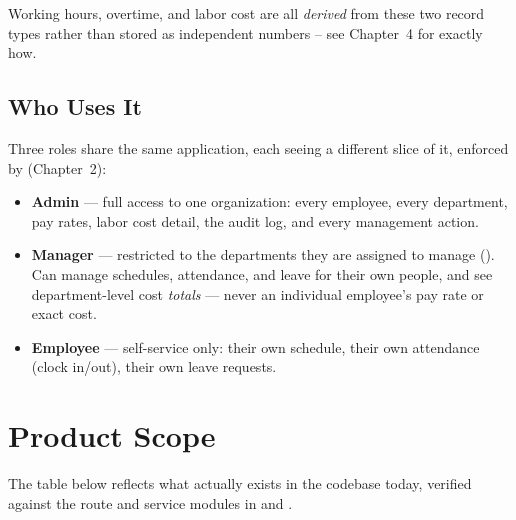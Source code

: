 Working hours, overtime, and labor cost are all \emph{derived} from
these two record types rather than stored as independent numbers -- see
Chapter~4 for exactly how.

\subsection*{Who Uses It}

Three roles share the same application, each seeing a different slice
of it, enforced by  (Chapter~2):

\begin{itemize}[nosep]
  \item \textbf{Admin} --- full access to one organization: every
        employee, every department, pay rates, labor cost detail, the
        audit log, and every management action.
  \item \textbf{Manager} --- restricted to the departments they are
        assigned to manage (). Can manage
        schedules, attendance, and leave for their own people, and see
        department-level cost \emph{totals} --- never an individual
        employee's pay rate or exact cost.
  \item \textbf{Employee} --- self-service only: their own schedule,
        their own attendance (clock in/out), their own leave requests.
\end{itemize}

\section{Product Scope}

The table below reflects what actually exists in the codebase today,
verified against the route and service modules in 
and .

